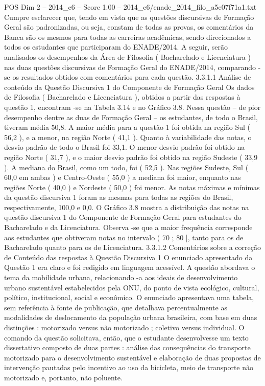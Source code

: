 \begin{textsample}{POS Dim 2 – 2014\_c6 – Score 1.00 – 2014\_c6/enade\_2014\_filo\_a5e07f71a1.txt}
Cumpre esclarecer que, tendo em vista que as questões discursivas de Formação Geral são padronizadas, ou seja, constam de todas as provas, os comentários da Banca são os mesmos para todas as carreiras acadêmicas, sendo direcionados a todos os estudantes que participaram do ENADE/2014.
A seguir, serão analisados os desempenhos da Área de Filosofia ( Bacharelado e Licenciatura ) nas duas questões discursivas de Formação Geral do ENADE/2014, comparando -se os resultados obtidos com comentários para cada questão. 3.3.1.1 Análise de conteúdo da Questão Discursiva 1 do Componente de Formação Geral Os dados de Filosofia ( Bacharelado e Licenciatura ), obtidos a partir das respostas à questão 1, encontram -se na Tabela 3.14 e no Gráfico 3.8.
Nessa questão – de pior desempenho dentre as duas de Formação Geral – os estudantes, de todo o Brasil, tiveram média 50,8.
A maior média para a questão 1 foi obtida na região Sul ( 56,2 ), e a menor, na região Norte ( 41,1 ).
Quanto à variabilidade das notas, o desvio padrão de todo o Brasil foi 33,1.
O menor desvio padrão foi obtido na região Norte ( 31,7 ), e o maior desvio padrão foi obtido na região Sudeste ( 33,9 ).
A mediana do Brasil, como um todo, foi ( 52,5 ).
Nas regiões Sudeste, Sul ( 60,0 em ambas ) e Centro-Oeste ( 55,0 ) a mediana foi maior, enquanto nas regiões Norte ( 40,0 ) e Nordeste ( 50,0 ) foi menor.
As notas máximas e mínimas da questão discursiva 1 foram as mesmas para todas as regiões do Brasil, respectivamente, 100,0 e 0,0.
O Gráfico 3.8 mostra a distribuição das notas na questão discursiva 1 do Componente de Formação Geral para estudantes do Bacharelado e da Licenciatura.
Observa -se que a maior frequência corresponde aos estudantes que obtiveram notas no intervalo ( 70 ; 80 ], tanto para os de Bacharelado quanto para os de Licenciatura. 3.3.1.2 Comentários sobre a correção de Conteúdo das respostas à Questão Discursiva 1 O enunciado apresentado da Questão 1 era claro e foi redigido em linguagem acessível.
A questão abordava o tema da mobilidade urbana, relacionando -a aos ideais de desenvolvimento urbano sustentável estabelecidos pela ONU, do ponto de vista ecológico, cultural, político, institucional, social e econômico.
O enunciado apresentava uma tabela, sem referência à fonte de publicação, que detalhava percentualmente as modalidades de deslocamento da população urbana brasileira, com base em duas distinções : motorizado versus não motorizado ; coletivo versus individual.
O comando da questão solicitava, então, que o estudante desenvolvesse um texto dissertativo composto de duas partes : análise das consequências do transporte motorizado para o desenvolvimento sustentável e elaboração de duas propostas de intervenção pautadas pelo incentivo ao uso da bicicleta, meio de transporte não motorizado e, portanto, não poluente.

\end{textsample}
